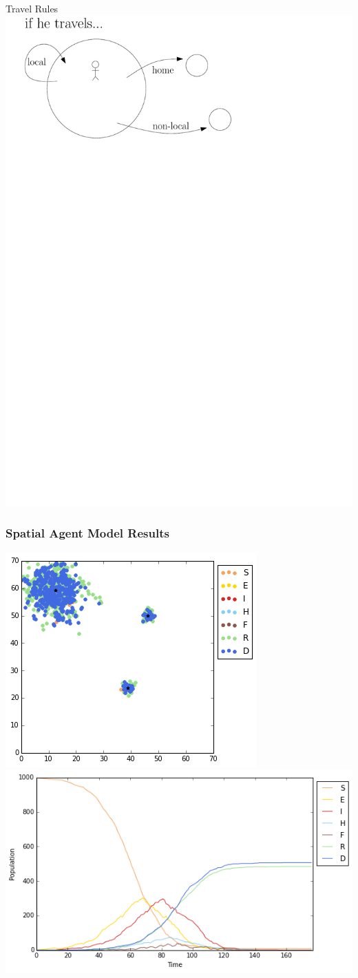 \documentclass[30pt]{beamer}
\begin{document}
\begin{frame}{Travel Rules}
\includegraphics[width=\textwidth]{travel}
\end{frame}


\begin{frame}
\frametitle{Spatial Agent Model Results}
\includegraphics[width=.41\textwidth]{map1}
\includegraphics[width=.59\textwidth]{time1}
\end{frame}
\end{document}
